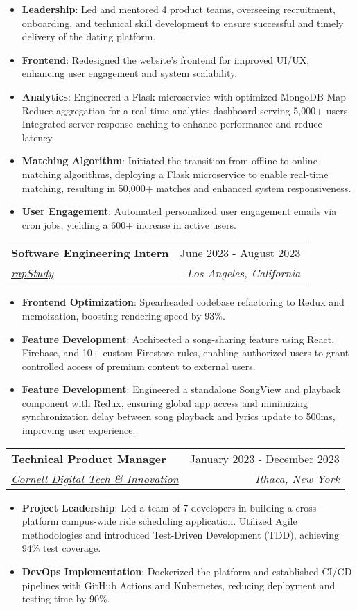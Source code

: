 \documentclass[letterpaper,10pt]{article}
\makeatletter
\newcommand{\resumeItem}[1]{
  \item\small{
    {#1 \vspace{-2.5pt}}
  }
}
\newcommand{\resumeSubheading}[4]{
  \vspace{-3pt}\item
    \begin{tabular*}{0.97\textwidth}[t]{@{}l@{\extracolsep{\fill}}r@{}}
      \textbf{#1} & #2 \\
      \textit{\small#3} & \textit{\small #4} \\
    \end{tabular*}\vspace{-6pt}
}
\newcommand{\resumeItemListStart}{\begin{itemize}}
\newcommand{\resumeItemListEnd}{\end{itemize}\vspace{-1.5pt}}
\makeatother
\begin{document}
\resumeItemListStart
\resumeItem{\textbf{Leadership}: Led and mentored 4 product teams, overseeing recruitment, onboarding, and technical skill development to ensure successful and timely delivery of the dating platform.}
\resumeItem{\textbf{Frontend}: Redesigned the website's frontend for improved UI/UX, enhancing user engagement and system scalability.}
\resumeItem{\textbf{Analytics}: Engineered a Flask microservice with optimized MongoDB Map-Reduce aggregation for a real-time analytics dashboard serving 5,000+ users. Integrated server response caching to enhance performance and reduce latency.}
\resumeItem{\textbf{Matching Algorithm}: Initiated the transition from offline to online matching algorithms, deploying a Flask microservice to enable real-time matching, resulting in 50,000+ matches and enhanced system responsiveness.}
\resumeItem{\textbf{User Engagement}: Automated personalized user engagement emails via cron jobs, yielding a 600+ increase in active users.}
\resumeItemListEnd
\vspace{-12pt}

\resumeSubheading{Software Engineering Intern}{June 2023 - August 2023}{\href{https://rapstudy.com/}{rapStudy}}{Los Angeles, California}
\resumeItemListStart
\resumeItem{\textbf{Frontend Optimization}: Spearheaded codebase refactoring to Redux and memoization, boosting rendering speed by 93\%.}
\resumeItem{\textbf{Feature Development}: Architected a song-sharing feature using React, Firebase, and 10+ custom Firestore rules, enabling authorized users to grant controlled access of premium content to external users.}
\resumeItem{\textbf{Feature Development}: Engineered a standalone SongView and playback component with Redux, ensuring global app access and minimizing synchronization delay between song playback and lyrics update to 500ms, improving user experience.}
\resumeItemListEnd

\resumeSubheading
{Technical Product Manager}{January 2023 - December 2023}
{\href{https://www.cornelldti.org/}{Cornell Digital Tech \& Innovation}}{Ithaca, New York}
\resumeItemListStart
\resumeItem{\textbf{Project Leadership}: Led a team of 7 developers in building a cross-platform campus-wide ride scheduling application. Utilized Agile methodologies and introduced Test-Driven Development (TDD), achieving 94\% test coverage.}
\resumeItem{\textbf{DevOps Implementation}: Dockerized the platform and established CI/CD pipelines with GitHub Actions and Kubernetes, reducing deployment and testing time by 90\%.}
\resumeItemListEnd
\end{document}

